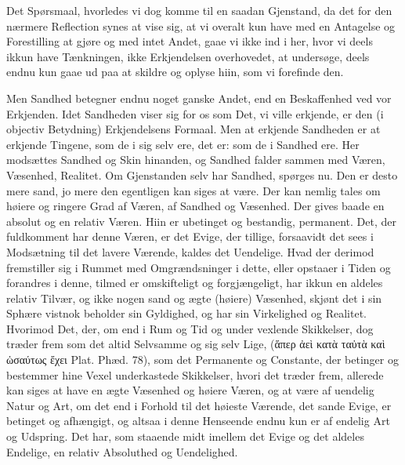 \documentclass[12pt]{book}
\def\textit#1{#1}%
\def\emph#1{#1}%
\newcommand{\opage}[1]{\marginnote{\footnotesize\textit{[#1]}}}
\begin{document}
Det Spørsmaal, hvorledes vi dog komme til en saadan Gjenstand, da det for den
nærmere Reflection synes at vise sig, at vi overalt kun have med en Antagelse
og Forestilling at gjøre og med intet Andet, gaae vi ikke ind i her, hvor vi
deels ikkun have Tænkningen, ikke Erkjendelsen overhovedet, at undersøge, deels
endnu kun gaae ud paa at skildre og oplyse hiin, som vi forefinde den.

Men Sandhed betegner endnu noget ganske Andet, end en Beskaffenhed ved vor
Erkjenden. Idet Sandheden viser sig for os som Det, vi ville erkjende, er den
(i \emph{objectiv} Betydning) Erkjendelsens Formaal. Men at erkjende Sandheden
er at erkjende Tingene, som de \emph{i sig selv} ere, det er: som de
\emph{i Sandhed} ere. Her modsættes Sandhed og Skin hinanden, og Sandhed falder
sammen med \emph{Væren, Væsenhed, Realitet}. Om Gjenstanden selv har Sandhed,
spørges nu. Den er desto mere \emph{sand}, jo mere den egentligen kan siges
\emph{at være}. Der kan nemlig tales om høiere og ringere Grad af Væren, af
\opage{19} Sandhed og Væsenhed. Der gives baade en \emph{absolut} og en \emph{relativ}
Væren. Hiin er ubetinget og bestandig, \emph{permanent}. Det, der fuldkomment
har denne Væren, er det Evige, der tillige, forsaavidt det sees i Modsætning
til det lavere Værende, kaldes det Uendelige. Hvad der derimod fremstiller sig
i Rummet med Omgrændsninger i dette, eller opstaaer i Tiden og forandres i
denne, tilmed er omskifteligt og forgjængeligt, har ikkun en aldeles
\emph{relativ} Tilvær, og ikke nogen sand og ægte (høiere) Væsenhed, skjønt det
i sin Sphære vistnok beholder sin Gyldighed, og har sin Virkelighed og
Realitet. Hvorimod Det, der, om end i Rum og Tid og under vexlende Skikkelser,
dog træder frem som det altid Selvsamme og sig selv Lige,
(\textit{ἅπερ ἀεὶ κατὰ ταὐτὰ καὶ ὡσαύτως ἔχει Plat. Phæd. 78}), som det
Permanente og Constante, der betinger og bestemmer hine Vexel underkastede
Skikkelser, hvori det træder frem, allerede kan siges at have en ægte Væsenhed
og høiere Væren, og at være af uendelig Natur og Art, om det end i Forhold til
det høieste Værende, det sande Evige, er betinget og afhængigt, og altsaa i
denne Henseende endnu kun er af endelig Art og Udspring. Det har, som staaende
midt imellem det Evige og det aldeles Endelige, en \emph{relativ} Absoluthed og
Uendelighed.
\end{document}
